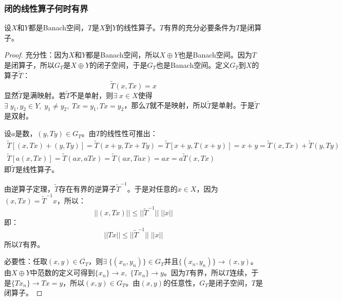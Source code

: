 \subsubsection{闭的线性算子何时有界}
\begin{theorem}
	设$X$和$Y$都是Banach空间，$T$是$X$到$Y$的线性算子。$T$有界的充分必要条件为$T$是闭算子。
\end{theorem}
\begin{proof}
	充分性：因为$X$和$Y$都是Banach空间，所以$X\oplus Y$也是Banach空间。因为$T$是闭算子，所以$G_T$是$X\oplus Y$的闭子空间，于是$G_T$也是Banach空间。定义$G_T$到$X$的算子$\tilde{T}$：
	\begin{equation*}
		\tilde{T}(x,Tx)=x
	\end{equation*}
	显然$\tilde{T}$是满映射。若$\tilde{T}$不是单射，则$\exists\;x\in X$使得$\exists\;y_1,y_2\in Y,\;y_1\ne y_2,\;Tx=y_1,Tx=y_2$，那么$T$就不是映射，所以$\tilde{T}$是单射。于是$\tilde{T}$是双射。\par
	设$a$是数，$(y,Ty)\in G_T$。由$T$的线性性可推出：
	\begin{gather*}
		\tilde{T}[(x,Tx)+(y,Ty)]=\tilde{T}(x+y,Tx+Ty)=\tilde{T}[x+y,T(x+y)]=x+y=\tilde{T}(x,Tx)+\tilde{T}(y,Ty) \\
		\tilde{T}[a(x,Tx)]=\tilde{T}(ax,aTx)=\tilde{T}(ax,Tax)=ax=a\tilde{T}(x,Tx)
	\end{gather*}
	即$\tilde{T}$是线性算子。\par
	由逆算子定理，$\tilde{T}$存在有界的逆算子$\tilde{T}^{-1}$。于是对任意的$x\in X$，因为$(x,Tx)=\tilde{T}^{-1}x$，所以：
	\begin{equation*}
		||(x,Tx)||\leqslant||\tilde{T}^{-1}||\;||x||
	\end{equation*}
	即：
	\begin{equation*}
		||Tx||\leqslant||\tilde{T}^{-1}||\;||x||
	\end{equation*}
	所以$T$有界。\par
	必要性：任取$(x,y)\in\overline{G_T}$，则$\exists\;\{(x_n,y_n)\}\in G_T$并且$\{(x_n,y_n)\}\to (x,y)$。由$X\oplus Y$中范数的定义可得到$\{x_n\}\to x,\;\{Tx_n\}\to y$。因为$T$有界，所以$T$连续，于是$\{Tx_n\}\to Tx=y$，所以$(x,y)\in G_T$。由$(x,y)$的任意性，$G_T$是闭子空间，$T$是闭算子。
\end{proof}
